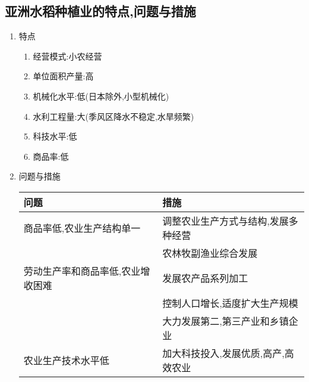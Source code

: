 \documentclass[a4paper]{article}
\begin{document}
    \subsection{亚洲水稻种植业的特点,问题与措施}
    \begin{enumerate}
        \item 特点
        \begin{enumerate}
            \item 经营模式:小农经营
            \item 单位面积产量:高
            \item 机械化水平:低(日本除外,小型机械化)
            \item 水利工程量:大(季风区降水不稳定,水旱频繁)
            \item 科技水平:低
            \item 商品率:低
        \end{enumerate}
        \item 问题与措施\\
            \begin{tabular}{|l|l|}
                \hline
                问题  &  措施    \\
                \hline
                商品率低,农业生产结构单一   &   调整农业生产方式与结构,发展多种经营 \\ & 农林牧副渔业综合发展    \\
                \hline
                劳动生产率和商品率低,农业增收困难  & 发展农产品系列加工 \\ & 控制人口增长,适度扩大生产规模 \\ & 大力发展第二,第三产业和乡镇企业    \\
                \hline
                农业生产技术水平低   &  加大科技投入,发展优质,高产,高效农业    \\
                \hline
            \end{tabular}
    \end{enumerate}
\end{document}
